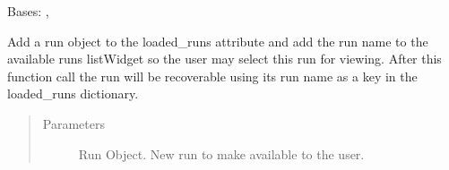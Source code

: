 \documentclass[letterpaper,10pt,english]{sphinxmanual}
\begin{document}
\begin{fulllineitems}
\label{\detokenize{polo.windows:polo.windows.main_window.MainWindow}}
Bases: , {\hyperref[\detokenize{polo.designer:polo.designer.UI_main_window.Ui_MainWindow}]{}}

\begin{fulllineitems}
\label{\detokenize{polo.windows:polo.windows.main_window.MainWindow.BAR_COLORS}}
\end{fulllineitems}


\begin{fulllineitems}
\label{\detokenize{polo.windows:polo.windows.main_window.MainWindow.CRYSTAL_ICON}}
\end{fulllineitems}


\begin{fulllineitems}
\label{\detokenize{polo.windows:polo.windows.main_window.MainWindow.add_loaded_run}}
Add a run object to the loaded\_runs attribute and add the run name to
the available runs listWidget so the user may select this run for
viewing. After this function call the run will be recoverable using
its run name as a key in the loaded\_runs dictionary.
\begin{quote}\begin{description}
\item[{Parameters}] \leavevmode
{} \textendash{} Run Object. New run to make available to the user.


\end{description}
\end{quote}
\end{fulllineitems}
\end{fulllineitems}
\end{document}
